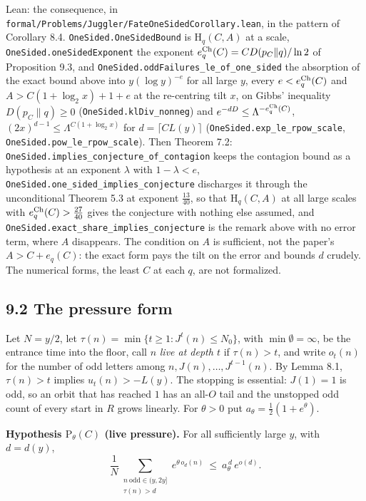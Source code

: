 \documentclass[11pt,a4paper]{article}
\begin{document}
Lean: the consequence, in
\texttt{\nolinkurl{formal/Problems/Juggler/FateOneSidedCorollary.lean}},
in the pattern of Corollary 8.4.
\texttt{\nolinkurl{OneSided.OneSidedBound}} is \(\mathrm H_q(C,A)\) at a
scale, \texttt{\nolinkurl{OneSided.oneSidedExponent}} the exponent
\(e^{\rm Ch}_q(C)=CD(p_C\|q)/\ln2\) of Proposition 9.3, and
\texttt{\nolinkurl{OneSided.oddFailures_le_of_one_sided}} the absorption
of the exact bound above into \(y(\log y)^{-e}\) for all large \(y\),
every \(e<e^{\rm Ch}_q(C)\) and \(A>C(1+\log_2x)+1+e\) at the
re-centring tilt \(x\), on Gibbs' inequality \(D(p_C\|q)\ge0\)
(\texttt{\nolinkurl{OneSided.klDiv_nonneg}}) and
\(e^{-dD}\le\Lambda^{-e^{\rm Ch}_q(C)}\),
\((2x)^{d-1}\le\Lambda^{C(1+\log_2x)}\) for \(d=\lceil CL(y)\rceil\)
(\texttt{\nolinkurl{OneSided.exp_le_rpow_scale}},
\texttt{\nolinkurl{OneSided.pow_le_rpow_scale}}). Then Theorem 7.2:
\texttt{\nolinkurl{OneSided.implies_conjecture_of_contagion}} keeps the
contagion bound as a hypothesis at an exponent \(\lambda\) with
\(1-\lambda<e\),
\texttt{\nolinkurl{OneSided.one_sided_implies_conjecture}} discharges it
through the unconditional Theorem 5.3 at exponent \(\tfrac{13}{40}\), so
that \(\mathrm H_q(C,A)\) at all large scales with
\(e^{\rm Ch}_q(C)>\tfrac{27}{40}\) gives the conjecture with nothing
else assumed, and
\texttt{\nolinkurl{OneSided.exact_share_implies_conjecture}} is the
remark above with no error term, where \(A\) disappears. The condition
on \(A\) is sufficient, not the paper's \(A>C+e_q(C)\): the exact form
pays the tilt on the error and bounds \(d\) crudely. The numerical
forms, the least \(C\) at each \(q\), are not formalized.

\subsection{9.2 The pressure form}\label{the-pressure-form}

Let \(N=y/2\), let \(\tau(n)=\min\{t\ge1:J^t(n)\le N_0\}\), with
\(\min\emptyset=\infty\), be the entrance time into the floor, call
\(n\) \emph{live at depth \(t\)} if \(\tau(n)>t\), and write \(o_t(n)\)
for the number of odd letters among \(n,J(n),\dots,J^{t-1}(n)\). By
Lemma 8.1, \(\tau(n)>t\) implies \(u_t(n)>-L(y)\). The stopping is
essential: \(J(1)=1\) is odd, so an orbit that has reached \(1\) has an
all-\(O\) tail and the unstopped odd count of every start in \(R\) grows
linearly. For \(\theta>0\) put \(a_\theta=\tfrac12(1+e^{\theta})\).

\textbf{Hypothesis \(\mathrm P_\theta(C)\) (live pressure).} For all
sufficiently large \(y\), with \(d=d(y)\), \[
\frac1N\sum_{\substack{n\ \mathrm{odd}\in(y,2y]\\ \tau(n)>d}}e^{\theta\,o_d(n)}
\ \le\ a_\theta^{\,d}\,e^{o(d)} .
\]
\end{document}
